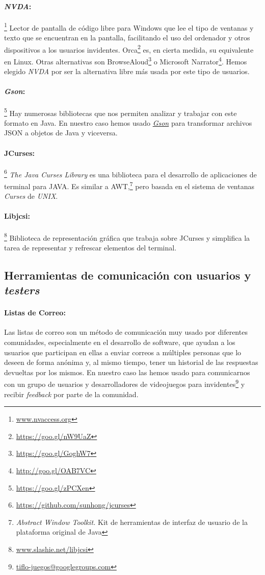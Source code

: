 \paragraph{\textit{NVDA}:}\footnote{\url{www.nvaccess.org}} Lector de pantalla de código libre para Windows que lee el tipo de ventanas y texto que se encuentran en la pantalla, facilitando el uso del ordenador y otros dispositivos a los usuarios invidentes. 
Orca\footnote{\url{https://goo.gl/nW9UaZ}} es, en cierta medida, su equivalente en Linux. Otras alternativas son BrowseAloud\footnote{\url{https://goo.gl/GoghW7}} o Microsoft Narrator\footnote{\url{http://goo.gl/OAB7VC}}. Hemos elegido \textit{NVDA} por ser la alternativa libre más usada por este tipo de usuarios.

\paragraph{\textit{Gson}:}\footnote{\url{https://goo.gl/zPCXen}} Hay numerosas bibliotecas que nos permiten analizar y trabajar con este formato en Java. En nuestro caso hemos usado \href{https://goo.gl/zPCXen}{\textit{Gson}} para transformar archivos JSON a objetos de Java y viceversa.

\paragraph{JCurses:}\footnote{\url{https://github.com/sunhong/jcurses}} \textit{The Java Curses Library} es una biblioteca para el desarrollo de aplicaciones de terminal para JAVA. Es similar a AWT,\footnote{\textit{Abstract Window Toolkit.} Kit de herramientas de interfaz de usuario de la plataforma original de Java} pero basada en el sistema de ventanas \textit{Curses} de \textit{UNIX}.

\paragraph{Libjcsi:}\footnote{\url{www.slashie.net/libjcsi}} Biblioteca de representación gráfica que trabaja sobre JCurses y simplifica la tarea de representar y refrescar elementos del terminal.

\subsection{Herramientas de comunicación con usuarios y \textit{testers}}

\paragraph{Listas de Correo:} Las listas de correo son un método de comunicación muy usado por diferentes comunidades, especialmente en el desarrollo de software, que ayudan a los usuarios que participan en ellas a enviar correos a múltiples personas que lo deseen de forma anónima y, al mismo tiempo, tener un historial de las respuestas devueltas por los mismos. En nuestro caso las hemos usado para comunicarnos con un grupo de usuarios y desarrolladores de videojuegos para invidentes\footnote{\url{tiflo-juegos@googlegroups.com}} y recibir \textit{feedback} por parte de la comunidad.

